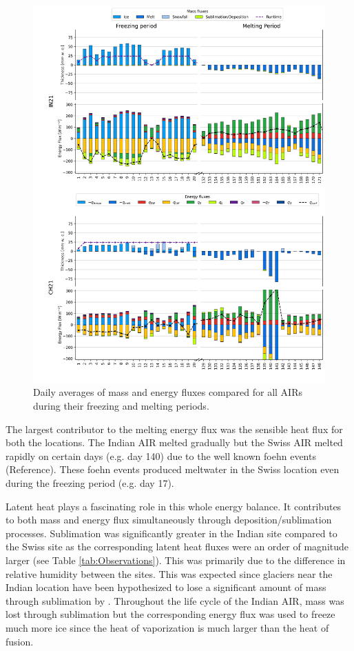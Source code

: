 \documentclass[utf8]{frontiersSCNS} %
\begin{document}
\begin{figure}
	\begin{center}
		\includegraphics[width=\linewidth]{Figures/mass_energy_bal.jpg} \end{center}
	\caption{Daily averages of mass and energy fluxes compared for all AIRs during their freezing and melting periods.
	} \label{fig:MEB}
\end{figure}

The largest contributor to the melting energy flux was the sensible heat flux for both the locations. The Indian
AIR melted gradually but the Swiss AIR melted rapidly on certain days (e.g.  day 140) due to the well known foehn
events (Reference). These foehn events produced meltwater in the Swiss location even during the freezing period
(e.g.  day 17).

Latent heat plays a fascinating role in this whole energy balance. It contributes to both mass and energy flux
simultaneously through deposition/sublimation processes. Sublimation was significantly greater in the Indian site
compared to the Swiss site as the corresponding latent heat fluxes were an order of magnitude larger (see Table
\ref{tab:Observations}). This was primarily due to the difference in relative humidity between the sites. This was
expected since glaciers near the Indian location have been hypothesized to lose a significant amount of mass
through sublimation by \cite{azam_2018}. Throughout the life cycle of the Indian AIR, mass was lost through
sublimation but the corresponding energy flux was used to freeze much more ice since the heat of vaporization is
much larger than the heat of fusion.
\end{document}
